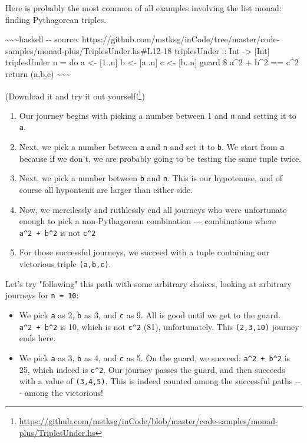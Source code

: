 \documentclass[]{article}
\renewcommand{\href}[2]{#2\footnote{\url{#1}}}
\begin{document}
Here is probably the most common of all examples involving the list monad:
finding Pythagorean triples.

\textasciitilde{}\textasciitilde{}\textasciitilde{}haskell -\/- source:
https://github.com/mstksg/inCode/tree/master/code-samples/monad-plus/TriplesUnder.hs\#L12-18
triplesUnder :: Int -\textgreater{} {[}Int{]} triplesUnder n = do a \textless{}-
{[}1..n{]} b \textless{}- {[}a..n{]} c \textless{}- {[}b..n{]} guard \$ a\^{}2 +
b\^{}2 == c\^{}2 return (a,b,c)
\textasciitilde{}\textasciitilde{}\textasciitilde{}

(\href{https://github.com/mstksg/inCode/blob/master/code-samples/monad-plus/TriplesUnder.hs}{Download
it and try it out yourself!})

\begin{enumerate}
\tightlist
\item
  Our journey begins with picking a number between 1 and \texttt{n} and setting
  it to \texttt{a}.
\item
  Next, we pick a number between \texttt{a} and \texttt{n} and set it to
  \texttt{b}. We start from \texttt{a} because if we don't, we are probably
  going to be testing the same tuple twice.
\item
  Next, we pick a number between \texttt{b} and \texttt{n}. This is our
  hypotenuse, and of course all hypontenii are larger than either side.
\item
  Now, we mercilessly and ruthlessly end all journeys who were unfortunate
  enough to pick a non-Pythagorean combination -\/-\/- combinations where
  \texttt{a\^{}2\ +\ b\^{}2} is not \texttt{c\^{}2}
\item
  For those successful journeys, we succeed with a tuple containing our
  victorious triple \texttt{(a,b,c)}.
\end{enumerate}

Let's try "following" this path with some arbitrary choices, looking at
arbitrary journeys for \texttt{n\ =\ 10}:

\begin{itemize}
\tightlist
\item
  We pick \texttt{a} as 2, \texttt{b} as 3, and \texttt{c} as 9. All is good
  until we get to the guard. \texttt{a\^{}2\ +\ b\^{}2} is 10, which is not
  \texttt{c\^{}2} (81), unfortunately. This \texttt{(2,3,10)} journey ends here.
\item
  We pick \texttt{a} as 3, \texttt{b} as 4, and \texttt{c} as 5. On the guard,
  we succeed: \texttt{a\^{}2\ +\ b\^{}2} is 25, which indeed is \texttt{c\^{}2}.
  Our journey passes the guard, and then succeeds with a value of
  \texttt{(3,4,5)}. This is indeed counted among the successful paths -\/-\/-
  among the victorious!
\end{itemize}
\end{document}

